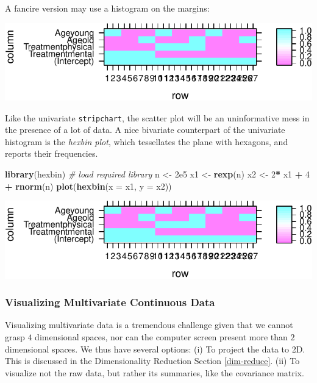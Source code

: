 \documentclass[]{book}
\newenvironment{Shaded}{\begin{snugshade}}{\end{snugshade}}
\newcommand{\KeywordTok}[1]{\textcolor[rgb]{0.13,0.29,0.53}{\textbf{#1}}}
\newcommand{\DataTypeTok}[1]{\textcolor[rgb]{0.13,0.29,0.53}{#1}}
\newcommand{\DecValTok}[1]{\textcolor[rgb]{0.00,0.00,0.81}{#1}}
\newcommand{\FloatTok}[1]{\textcolor[rgb]{0.00,0.00,0.81}{#1}}
\newcommand{\StringTok}[1]{\textcolor[rgb]{0.31,0.60,0.02}{#1}}
\newcommand{\CommentTok}[1]{\textcolor[rgb]{0.56,0.35,0.01}{\textit{#1}}}
\newcommand{\OperatorTok}[1]{\textcolor[rgb]{0.81,0.36,0.00}{\textbf{#1}}}
\newcommand{\NormalTok}[1]{#1}
\theoremstyle{definition}
\theoremstyle{definition}
\theoremstyle{definition}
\theoremstyle{remark}
\begin{document}
A fancire version may use a histogram on the margins:

\includegraphics[width=0.5\linewidth]{Rcourse_files/figure-latex/unnamed-chunk-124-1}

Like the univariate \texttt{stripchart}, the scatter plot will be an
uninformative mess in the presence of a lot of data. A nice bivariate
counterpart of the univariate histogram is the \emph{hexbin plot}, which
tessellates the plane with hexagons, and reports their frequencies.

\begin{Shaded}
\begin{Highlighting}[]
\KeywordTok{library}\NormalTok{(hexbin) }\CommentTok{# load required library}
\NormalTok{n <-}\StringTok{ }\FloatTok{2e5}
\NormalTok{x1 <-}\StringTok{ }\KeywordTok{rexp}\NormalTok{(n)}
\NormalTok{x2 <-}\StringTok{ }\DecValTok{2}\OperatorTok{*}\StringTok{ }\NormalTok{x1 }\OperatorTok{+}\StringTok{ }\DecValTok{4} \OperatorTok{+}\StringTok{ }\KeywordTok{rnorm}\NormalTok{(n)}
\KeywordTok{plot}\NormalTok{(}\KeywordTok{hexbin}\NormalTok{(}\DataTypeTok{x =}\NormalTok{ x1, }\DataTypeTok{y =}\NormalTok{ x2))}
\end{Highlighting}
\end{Shaded}

\includegraphics[width=0.5\linewidth]{Rcourse_files/figure-latex/unnamed-chunk-125-1}

\subsubsection{Visualizing Multivariate Continuous
Data}\label{visualizing-multivariate-continuous-data}

Visualizing multivariate data is a tremendous challenge given that we
cannot grasp \(4\) dimensional spaces, nor can the computer screen
present more than \(2\) dimensional spaces. We thus have several
options: (i) To project the data to 2D. This is discussed in the
Dimensionality Reduction Section \ref{dim-reduce}. (ii) To visualize not
the raw data, but rather its summaries, like the covariance matrix.
\end{document}
